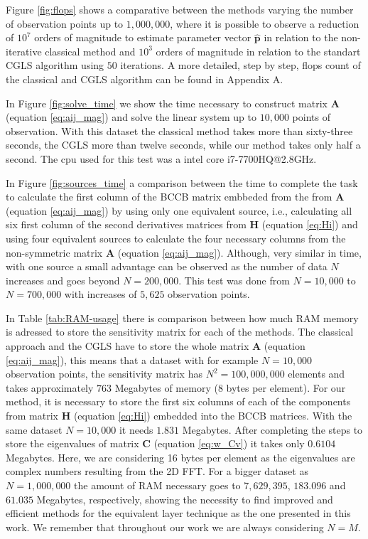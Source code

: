 Figure \ref{fig:flops} shows a comparative between the methods varying the number of observation points up to $1,000,000$, where it is possible to observe a reduction of $10^7$ orders of magnitude to estimate parameter vector $\mathbf{\hat{p}}$ in relation to the non-iterative classical method and $10^3$ orders of magnitude in relation to the standart CGLS algorithm using $50$ iterations. A more detailed, step by step, flops count of the classical and CGLS algorithm can be found in Appendix A.

In Figure \ref{fig:solve_time} we show the time necessary to construct matrix $\mathbf{A}$ (equation \ref{eq:aij_mag}) and solve the linear system up to $10,000$ points of observation. With this dataset the classical method takes more than sixty-three seconds, the CGLS more than twelve seconds, while our method takes only half a second. The cpu used for this test was a intel core i7-7700HQ@2.8GHz.

In Figure \ref{fig:sources_time} a comparison between the time to complete the task to calculate the first column of the BCCB matrix embbeded from the from $\mathbf{A}$ (equation \ref{eq:aij_mag}) by using only one equivalent source, i.e., calculating all six first column of the second derivatives matrices from $\mathbf{H}$ (equation \ref{eq:Hi}) and using four equivalent sources to calculate the four necessary columns from the non-symmetric matrix $\mathbf{A}$ (equation \ref{eq:aij_mag}). Although, very similar in time, with one source a small advantage can be observed as the number of data $N$ increases and goes beyond $N = 200,000$. This test was done from $N = 10,000$ to $N = 700,000$ with increases of $5,625$ observation points.

In Table \ref{tab:RAM-usage} there is comparison between how much RAM memory is adressed to store the sensitivity matrix for each of the methods. The classical approach and the CGLS have to store the whole matrix $\mathbf{A}$ (equation \ref{eq:aij_mag}), this means that a dataset  with for example $N = 10,000$ observation points, the sensitivity matrix has $N^2 = 100,000,000$ elements and takes approximately $763$ Megabytes of memory (8 bytes per element). For our method, it is necessary to store the first six columns of each of the components from matrix $\mathbf{H}$ (equation \ref{eq:Hi}) embedded into the BCCB matrices. With the same dataset $N = 10,000$ it needs $1.831$ Megabytes. After completing the steps to store the eigenvalues of matrix $\mathbf{C}$ (equation \ref{eq:w_Cv}) it takes only $0.6104$ Megabytes. Here, we are considering 16 bytes per element as the eigenvalues are complex numbers resulting from the 2D FFT. For a bigger dataset as $N = 1,000,000$ the amount of RAM necessary goes to $7,629,395$, $183.096$ and $61.035$ Megabytes, respectively, showing the necessity to find improved and efficient methods for the equivalent layer technique as the one presented in this work. We remember that throughout our work we are always considering $N = M$.










